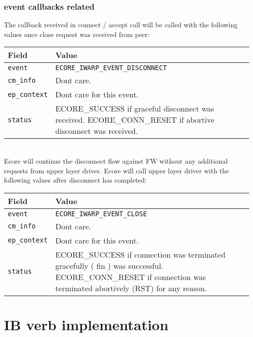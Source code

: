 \documentclass[11pt,fleqn,hidelinks,oneside]{book} %
\newcommand{\insertcode}[2]{\begin{itemize}\item[]\end{itemize}} %
\newcommand{\ChapterFuncs}{}
\newcommand{\silentfunc}[1]
{\expandafter\def\expandafter\ChapterFuncs\expandafter{\ChapterFuncs { } \insertcode{snippets/#1_generated.h}{}}}
\begin{document}
\subsubsection{event callbacks related}
The callback received in connect / accept call will be called with the following values once close request was received from peer: \newline
\begin{tabular}{| l | p{10cm} |}
	\hline
	\textbf{Field} & \textbf{Value} \\ \hline
	\texttt{event} & \texttt{ECORE\_IWARP\_EVENT\_DISCONNECT} \\ \hline
	\texttt{cm\_info} & Dont care. \\ \hline
	\texttt{ep\_context} & Dont care for this event. \\ \hline
	\texttt{status} & ECORE\_SUCCESS if graceful disconnect was received. ECORE\_CONN\_RESET if abortive disconnect was received. \\ \hline
\end{tabular}
\\
Ecore will continue the disconnect flow against FW without any additional requests from upper layer driver. Ecore will call upper layer driver with the following values after disconnect has completed: \newline
\begin{tabular}{| l | p{10cm} |}
	\hline
	\textbf{Field} & \textbf{Value} \\ \hline
	\texttt{event} & \texttt{ECORE\_IWARP\_EVENT\_CLOSE} \\ \hline
	\texttt{cm\_info} & Dont care. \\ \hline
	\texttt{ep\_context} & Dont care for this event. \\ \hline
	\texttt{status} & ECORE\_SUCCESS if connection was terminated gracefully ( fin ) was successful. ECORE\_CONN\_RESET if connection was terminated abortively (RST) for any reason. \\ \hline
\end{tabular}

\section{IB verb implementation}

\silentfunc{rdma_alloc_pd}
\silentfunc{rdma_alloc_tid}
\silentfunc{rdma_create_qp}
\end{document}
